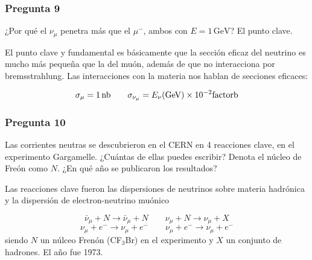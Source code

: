 \vspace*{2em}

\begin{Enunciado}
	\subsubsection*{Pregunta 9}

	¿Por qué el $\nu_\mu$ penetra más que el $\mu^-$, ambos con $E = 1\,\mathrm{GeV}$? El punto clave.

\end{Enunciado}

El punto clave y fundamental es básicamente que la sección eficaz del neutrino es mucho más pequeña que la del muón, además de que no interacciona por bremsstrahlung. Las interacciones con la materia nos hablan de secciones eficaces: 

\begin{equation}
    \sigma_{\mu} = \SI{1}{nb} \qquad \sigma_{\nu_{\mu}} = {E_{\nu}(\text{GeV})} \times 10^{-2}  \SI{}{factorb}
\end{equation}
\vspace*{2em}

\begin{Enunciado}
	\subsubsection*{Pregunta 10}

	Las corrientes neutras se descubrieron en el CERN en 4 reacciones clave, en el experimento Gargamelle. ¿Cuántas de ellas puedes escribir? Denota el núcleo de Freón como $N$. ¿En qué año se publicaron los resultados?

\end{Enunciado}

Las reacciones clave fueron las dispersiones de neutrinos sobre materia hadrónica y la dispersión de electron-neutrino muónico

\begin{equation}
    \bar{\nu}_\mu + N \rightarrow  \bar{\nu}_\mu + N  \qquad 
    {\nu}_\mu + N \rightarrow   {\nu}_\mu + X
\end{equation}
\begin{equation}
    {\nu}_\mu + e^- \rightarrow   {\nu}_\mu + e^- \qquad 
    {\nu}_\mu + e^- \rightarrow   {\nu}_\mu + e^-
\end{equation}
siendo $N$ un núlceo Frenón  (CF$_3$Br) en el experimento y $X$ un conjunto de hadrones. El año fue 1973.  

